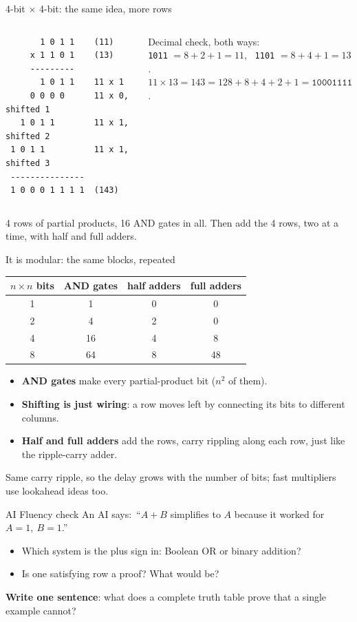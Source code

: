 \documentclass[aspectratio=169,10pt]{beamer}
\begin{document}
\begin{frame}[fragile]{4-bit $\times$ 4-bit: the same idea, more rows}
\begin{columns}[c]
\begin{verbatim}
       1 0 1 1    (11)
     x 1 1 0 1    (13)
     ---------
       1 0 1 1    11 x 1
     0 0 0 0      11 x 0, shifted 1
   1 0 1 1        11 x 1, shifted 2
 1 0 1 1          11 x 1, shifted 3
 ---------------
 1 0 0 0 1 1 1 1  (143)
\end{verbatim}
\small
Decimal check, both ways:\\
\texttt{1011} $=8+2+1=11$, \ \texttt{1101} $=8+4+1=13$.\\
$11\times13=143=128+8+4+2+1=\texttt{10001111}$.
\end{columns}
\vspace{4pt}
4 rows of partial products, 16 AND gates in all. Then add the 4 rows, two at a time, with half and full adders.
\end{frame}

\begin{frame}{It is modular: the same blocks, repeated}
\begin{center}
\begin{tabular}{c|ccc}
$n\times n$ bits & AND gates & half adders & full adders\\\hline
1 & 1 & 0 & 0\\
2 & 4 & 2 & 0\\
4 & 16 & 4 & 8\\
8 & 64 & 8 & 48
\end{tabular}
\end{center}
\begin{itemize}
\item \textbf{AND gates} make every partial-product bit ($n^2$ of them).
\item \textbf{Shifting is just wiring}: a row moves left by connecting its bits to different columns.
\item \textbf{Half and full adders} add the rows, carry rippling along each row, just like the ripple-carry adder.
\end{itemize}
Same carry ripple, so the delay grows with the number of bits; fast multipliers use lookahead ideas too.
\end{frame}


\begin{frame}{AI Fluency check}
An AI says:\ ``$A+B$ simplifies to $A$ because it worked for $A=1,\ B=1$.''
\begin{itemize}
\item Which system is the plus sign in: Boolean OR or binary addition?
\item Is one satisfying row a proof? What would be?
\end{itemize}
\textbf{Write one sentence}: what does a complete truth table prove that a single example cannot?
\end{frame}
\end{document}
